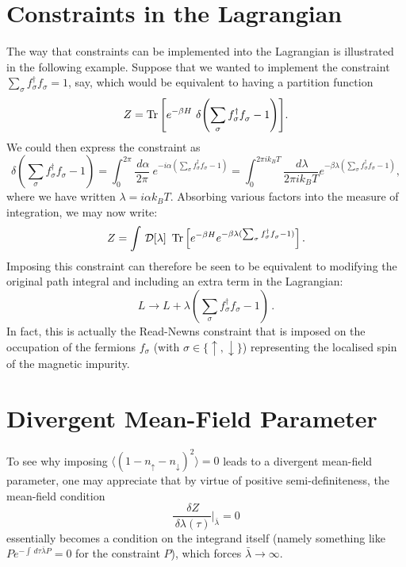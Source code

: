 
\appendix

\section{Constraints in the Lagrangian}
\label{sec:Constraints}

The way that constraints can be implemented into the Lagrangian is illustrated in the following example. Suppose that we wanted to implement the constraint $ \sum_{\sigma} f^{\dagger}_{\sigma} f^{}_{\sigma} = 1 $, say, which would be equivalent to having a partition function $$ Z = \operatorname{Tr}{\left[ e^{- \beta H}~\delta{\left( \sum_{\sigma} f^{\dagger}_{\sigma} f^{}_{\sigma} - 1 \right)} \right]} . $$ We could then express the constraint as $$ \delta{\left( \sum_{\sigma} f^{\dagger}_{\sigma} f^{}_{\sigma} - 1 \right)} = \int_{0}^{2 \pi} \frac{\,d\alpha}{2 \pi}~e^{- i \alpha (\sum_{\sigma} f^{\dagger}_{\sigma} f^{}_{\sigma} - 1)} = \int_{0}^{2 \pi i k_B T} \frac{\,d \lambda}{2 \pi i k_B T} e^{- \beta \lambda (\sum_{\sigma} f^{\dagger}_{\sigma} f^{}_{\sigma} - 1)}, $$ where we have written $ \lambda = i \alpha k_B T $. Absorbing various factors into the measure of integration, we may now write: $$ Z = \int \, \mathcal{D} [\lambda]~\operatorname{Tr}{\left[ e^{- \beta H} e^{- \beta \lambda (\sum_{\sigma} f^{\dagger}_{\sigma} f^{}_{\sigma} - 1)} \right]} \,. $$ Imposing this constraint can therefore be seen to be equivalent to modifying the original path integral and including an extra term in the Lagrangian: $$ L \rightarrow L + \lambda \left( \sum_{\sigma} f^{\dagger}_{\sigma} f^{}_{\sigma} - 1 \right) \,. $$ In fact, this is actually the Read-Newns constraint that is imposed on the occupation of the fermions $ f^{}_{\sigma} $ (with $ \sigma \in \{ \uparrow , \downarrow \}$) representing the localised spin of the magnetic impurity.

\section{Divergent Mean-Field Parameter}
\label{sec:Divergence}

To see why imposing $ \langle (1 - n_{\uparrow} - n_{\downarrow})^2 \rangle = 0 $ leads to a divergent mean-field parameter, one may appreciate that by virtue of positive semi-definiteness, the mean-field condition \[ \frac{\, \delta Z}{\, \delta \lambda(\tau)} \Bigr|_{\bar{\lambda}} = 0 \] essentially becomes a condition on the integrand itself (namely something like $ P e^{- \int \, d\tau \bar{\lambda} P} = 0 $ for the constraint $ P $), which forces $ \bar{\lambda} \rightarrow \infty $.

